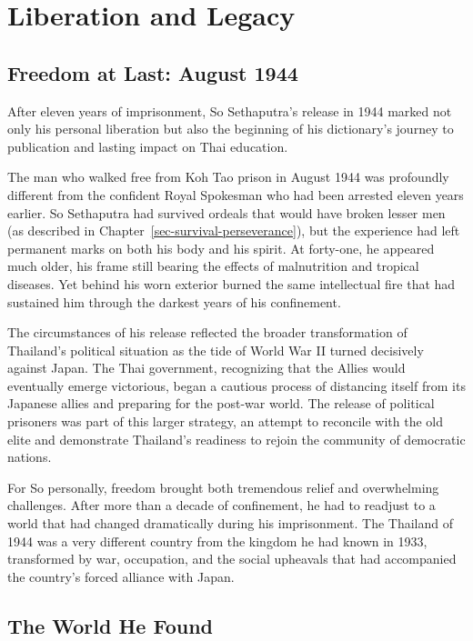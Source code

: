 \documentclass[
  Letterpaper,
]{scrbook}
\begin{document}

\chapter{Liberation and Legacy}\label{sec-liberation-legacy}

\section{Freedom at Last: August
1944}\label{freedom-at-last-august-1944}

After eleven years of imprisonment, So Sethaputra's release in 1944
marked not only his personal liberation but also the beginning of his
dictionary's journey to publication and lasting impact on Thai
education.

The man who walked free from Koh Tao prison in August 1944 was
profoundly different from the confident Royal Spokesman who had been
arrested eleven years earlier. So Sethaputra had survived ordeals that
would have broken lesser men (as described in
Chapter~\ref{sec-survival-perseverance}), but the experience had left
permanent marks on both his body and his spirit. At forty-one, he
appeared much older, his frame still bearing the effects of malnutrition
and tropical diseases. Yet behind his worn exterior burned the same
intellectual fire that had sustained him through the darkest years of
his confinement.

The circumstances of his release reflected the broader transformation of
Thailand's political situation as the tide of World War II turned
decisively against Japan. The Thai government, recognizing that the
Allies would eventually emerge victorious, began a cautious process of
distancing itself from its Japanese allies and preparing for the
post-war world. The release of political prisoners was part of this
larger strategy, an attempt to reconcile with the old elite and
demonstrate Thailand's readiness to rejoin the community of democratic
nations.

For So personally, freedom brought both tremendous relief and
overwhelming challenges. After more than a decade of confinement, he had
to readjust to a world that had changed dramatically during his
imprisonment. The Thailand of 1944 was a very different country from the
kingdom he had known in 1933, transformed by war, occupation, and the
social upheavals that had accompanied the country's forced alliance with
Japan.

\section{The World He Found}\label{the-world-he-found}
\end{document}
